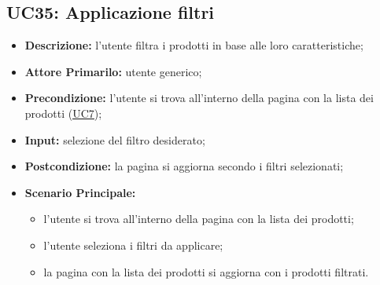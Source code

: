 \subsection{UC35: Applicazione filtri}
\label{sec:UC35}
\begin{itemize}
    \item \textbf{Descrizione:} l'utente filtra i prodotti in base alle loro caratteristiche;
    \item \textbf{Attore Primarilo:} utente generico;
    \item \textbf{Precondizione:} l'utente si trova all'interno della pagina con la lista dei prodotti (\hyperref[sec:UC7]{\underline{UC7}});
    \item \textbf{Input:} selezione del filtro desiderato;
    \item \textbf{Postcondizione:} la pagina si aggiorna secondo i filtri selezionati;
    \item \textbf{Scenario Principale:}
          \begin{itemize}
              \item l'utente si trova all'interno della pagina con la lista dei prodotti;
              \item l'utente seleziona i filtri da applicare;
              \item la pagina con la lista dei prodotti si aggiorna con i prodotti filtrati.
          \end{itemize}
\end{itemize}